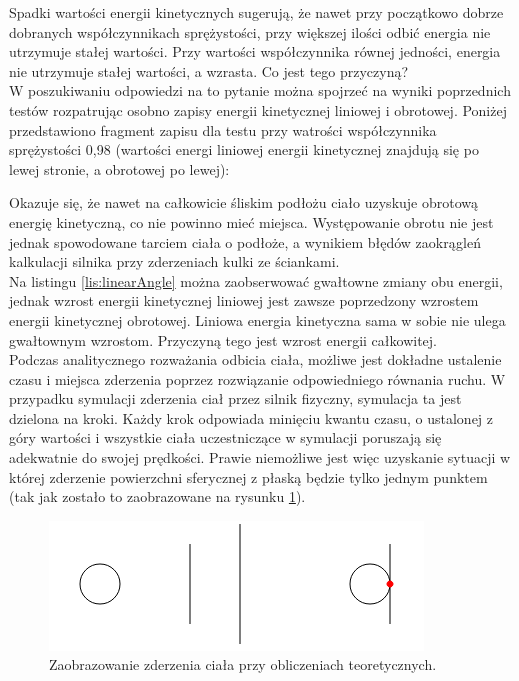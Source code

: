 Spadki wartości energii kinetycznych sugerują, że nawet przy początkowo dobrze
dobranych współczynnikach sprężystości, przy większej ilości odbić energia nie
utrzymuje stałej wartości. Przy wartości współczynnika równej jedności, energia
nie utrzymuje stałej wartości, a wzrasta. Co jest tego przyczyną? \\
W poszukiwaniu odpowiedzi na to pytanie można spojrzeć na wyniki poprzednich
testów rozpatrując osobno zapisy energii kinetycznej liniowej i obrotowej.
Poniżej przedstawiono fragment zapisu dla testu przy watrości współczynnika
sprężystości 0,98 (wartości energi liniowej energii kinetycznej znajdują się
po lewej stronie, a obrotowej po lewej):



Okazuje się, że nawet na całkowicie śliskim podłożu ciało uzyskuje obrotową
energię kinetyczną, co nie powinno mieć miejsca. Występowanie obrotu nie jest
jednak spowodowane tarciem ciała o podłoże, a wynikiem błędów zaokrągleń
kalkulacji silnika przy zderzeniach kulki ze ściankami.\\
\newpage
Na listingu \ref{lis:linearAngle} można zaobserwować gwałtowne zmiany obu
energii, jednak wzrost energii kinetycznej liniowej jest zawsze poprzedzony
wzrostem energii kinetycznej obrotowej. Liniowa energia kinetyczna sama w sobie
nie ulega gwałtownym wzrostom. Przyczyną tego jest wzrost energii całkowitej.\\
Podczas analitycznego rozważania odbicia ciała, możliwe jest dokładne ustalenie
czasu i miejsca zderzenia poprzez rozwiązanie odpowiedniego równania ruchu. W
przypadku symulacji zderzenia ciał przez silnik fizyczny, symulacja ta jest
dzielona na kroki. Każdy krok odpowiada minięciu kwantu czasu, o ustalonej z
góry wartości i wszystkie ciała uczestniczące w symulacji poruszają się adekwatnie do
swojej prędkości. Prawie niemożliwe jest więc uzyskanie sytuacji w której
zderzenie powierzchni sferycznej z płaską będzie tylko jednym punktem (tak jak
zostało to zaobrazowane na rysunku \ref{fig:zderzenie1}).

\begin{figure}[H]
\centering
\includegraphics{./img/zderzenie1.png}
\caption{Zaobrazowanie zderzenia ciała przy obliczeniach teoretycznych.}
\label{fig:zderzenie1}
\end{figure}

